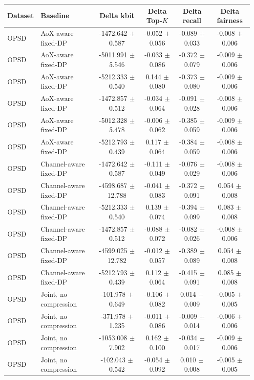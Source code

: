 \begin{tabular}{llcccc}
\toprule
Dataset & Baseline & Delta kbit & Delta Top-$K$ & Delta recall & Delta fairness \\
\midrule
OPSD & AoX-aware fixed-DP & -1472.642 $\pm$ 0.587 & -0.052 $\pm$ 0.056 & -0.089 $\pm$ 0.033 & -0.008 $\pm$ 0.006 \\
OPSD & AoX-aware fixed-DP & -5011.991 $\pm$ 5.546 & -0.033 $\pm$ 0.086 & -0.372 $\pm$ 0.079 & -0.009 $\pm$ 0.006 \\
OPSD & AoX-aware fixed-DP & -5212.333 $\pm$ 0.540 & 0.144 $\pm$ 0.080 & -0.373 $\pm$ 0.080 & -0.009 $\pm$ 0.006 \\
OPSD & AoX-aware fixed-DP & -1472.857 $\pm$ 0.512 & -0.034 $\pm$ 0.064 & -0.091 $\pm$ 0.028 & -0.008 $\pm$ 0.006 \\
OPSD & AoX-aware fixed-DP & -5012.328 $\pm$ 5.478 & -0.006 $\pm$ 0.062 & -0.385 $\pm$ 0.059 & -0.009 $\pm$ 0.006 \\
OPSD & AoX-aware fixed-DP & -5212.793 $\pm$ 0.439 & 0.117 $\pm$ 0.064 & -0.384 $\pm$ 0.059 & -0.008 $\pm$ 0.006 \\
OPSD & Channel-aware fixed-DP & -1472.642 $\pm$ 0.587 & -0.111 $\pm$ 0.049 & -0.076 $\pm$ 0.029 & -0.008 $\pm$ 0.006 \\
OPSD & Channel-aware fixed-DP & -4598.687 $\pm$ 12.788 & -0.041 $\pm$ 0.083 & -0.372 $\pm$ 0.091 & 0.054 $\pm$ 0.008 \\
OPSD & Channel-aware fixed-DP & -5212.333 $\pm$ 0.540 & 0.139 $\pm$ 0.074 & -0.394 $\pm$ 0.099 & 0.083 $\pm$ 0.008 \\
OPSD & Channel-aware fixed-DP & -1472.857 $\pm$ 0.512 & -0.088 $\pm$ 0.072 & -0.082 $\pm$ 0.026 & -0.008 $\pm$ 0.006 \\
OPSD & Channel-aware fixed-DP & -4599.025 $\pm$ 12.782 & -0.012 $\pm$ 0.057 & -0.389 $\pm$ 0.089 & 0.054 $\pm$ 0.008 \\
OPSD & Channel-aware fixed-DP & -5212.793 $\pm$ 0.439 & 0.112 $\pm$ 0.064 & -0.415 $\pm$ 0.091 & 0.085 $\pm$ 0.008 \\
OPSD & Joint, no compression & -101.978 $\pm$ 0.649 & -0.106 $\pm$ 0.082 & 0.014 $\pm$ 0.009 & -0.005 $\pm$ 0.005 \\
OPSD & Joint, no compression & -371.978 $\pm$ 1.235 & -0.011 $\pm$ 0.086 & -0.009 $\pm$ 0.014 & -0.006 $\pm$ 0.006 \\
OPSD & Joint, no compression & -1053.008 $\pm$ 7.902 & 0.162 $\pm$ 0.100 & -0.034 $\pm$ 0.017 & -0.009 $\pm$ 0.006 \\
OPSD & Joint, no compression & -102.043 $\pm$ 0.542 & -0.054 $\pm$ 0.092 & 0.010 $\pm$ 0.008 & -0.005 $\pm$ 0.005 \\

\end{tabular}
